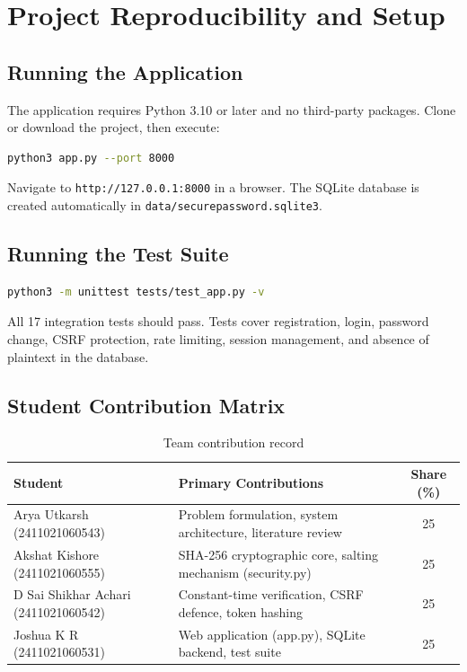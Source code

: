 \documentclass[12pt,a4paper,oneside]{report}
\begin{document}
\AllianceMainMatter








\clearpage
\printbibliography[heading=bibintoc,title={REFERENCES}]

\appendix
\chapter{Project Reproducibility and Setup}
\label{app:setup}

\section{Running the Application}
\label{sec:running}
The application requires Python 3.10 or later and no third-party packages. Clone or download the project, then execute:
\begin{lstlisting}[language=bash]
python3 app.py --port 8000
\end{lstlisting}
Navigate to \texttt{http://127.0.0.1:8000} in a browser. The SQLite database is created automatically in \texttt{data/securepassword.sqlite3}.

\section{Running the Test Suite}
\label{sec:tests}
\begin{lstlisting}[language=bash]
python3 -m unittest tests/test_app.py -v
\end{lstlisting}
All 17 integration tests should pass. Tests cover registration, login, password change, CSRF protection, rate limiting, session management, and absence of plaintext in the database.

\section{Student Contribution Matrix}
\label{sec:contribution}
\begin{table}[H]
\centering
\caption{Team contribution record}
\label{tab:contribution}
\begin{tabularx}{\textwidth}{|l|X|c|}\hline
\textbf{Student} & \textbf{Primary Contributions} & \textbf{Share (\%)}\\\hline
Arya Utkarsh (2411021060543) & Problem formulation, system architecture, literature review & 25\\\hline
Akshat Kishore (2411021060555) & SHA-256 cryptographic core, salting mechanism (security.py) & 25\\\hline
D Sai Shikhar Achari (2411021060542) & Constant-time verification, CSRF defence, token hashing & 25\\\hline
Joshua K R (2411021060531) & Web application (app.py), SQLite backend, test suite & 25\\\hline
\end{tabularx}
\end{table}
\end{document}
